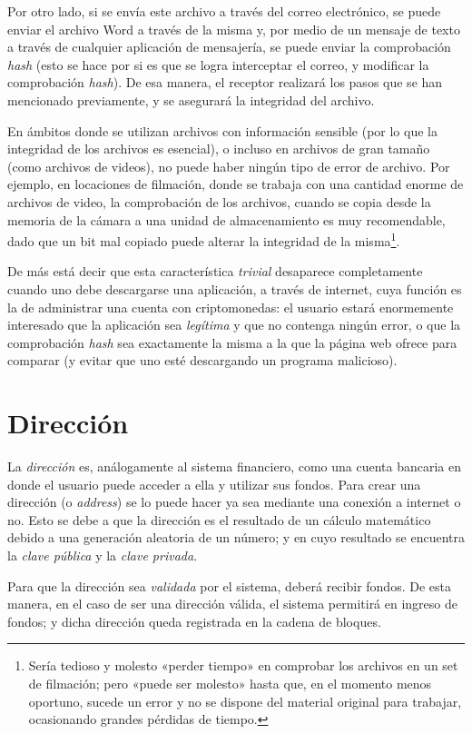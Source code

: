 \documentclass[12pt,a4paper,twoside]{book}
\begin{document}
Por otro lado, si se envía este archivo a través del correo electrónico, se puede enviar el archivo Word a través de la misma y, por medio de un mensaje de texto a través de cualquier aplicación de mensajería, se puede enviar la comprobación \textit{hash} (esto se hace por si es que se logra interceptar el correo, y modificar la comprobación \textit{hash}). De esa manera, el receptor realizará los pasos que se han mencionado previamente, y se asegurará la integridad del archivo.

En ámbitos donde se utilizan archivos con información sensible (por lo que la integridad de los archivos es esencial), o incluso en archivos de gran tamaño (como archivos de videos), no puede haber ningún tipo de error de archivo. Por ejemplo, en locaciones de filmación, donde se trabaja con una cantidad enorme de archivos de video, la comprobación de los archivos, cuando se copia desde la memoria de la cámara a una unidad de almacenamiento es muy recomendable, dado que un bit mal copiado puede alterar la integridad de la misma\footnote{Sería tedioso y molesto «perder tiempo» en comprobar los archivos en un set de filmación; pero «puede ser molesto» hasta que, en el momento menos oportuno, sucede un error y no se dispone del material original para trabajar, ocasionando grandes pérdidas de tiempo.}.

De más está decir que esta característica \textit{trivial} desaparece completamente cuando uno debe descargarse una aplicación, a través de internet, cuya función es la de administrar una cuenta con criptomonedas: el usuario estará enormemente interesado que la aplicación sea \textit{legítima} y que no contenga ningún error, o que la comprobación \textit{hash} sea exactamente la misma a la que la página web ofrece para comparar (y evitar que uno esté descargando un programa malicioso).

\section{Dirección}
La \textit{dirección} es, análogamente al sistema financiero, como una cuenta bancaria en donde el usuario puede acceder a ella y utilizar sus fondos. Para crear una dirección (o \textit{address}) se lo puede hacer ya sea mediante una conexión a internet o no. Esto se debe a que la dirección es el resultado de un cálculo matemático debido a una generación aleatoria de un número; y en cuyo resultado se encuentra la \textit{clave pública} y la \textit{clave privada}.

Para que la dirección sea \textit{validada} por el sistema, deberá recibir fondos. De esta manera, en el caso de ser una dirección válida, el sistema permitirá en ingreso de fondos; y dicha dirección queda registrada en la cadena de bloques.
\end{document}
